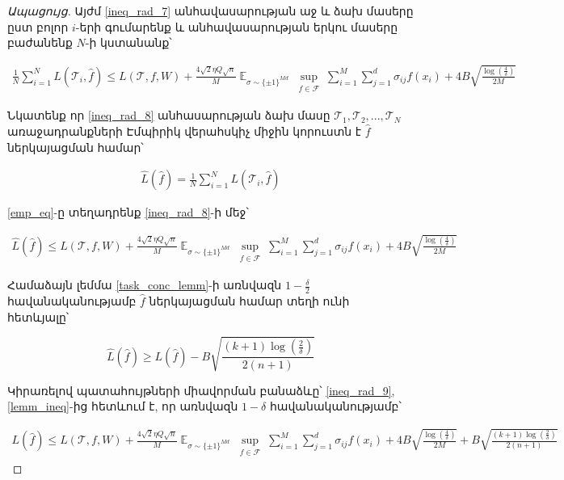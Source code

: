 \documentclass[11pt]{article}
\DeclareMathOperator*{\E}{\mathbb{E}}
\begin{document}
\begin{proof}[Ապացույց]
Այժմ \ref{ineq_rad_7} անհավասարության աջ և ձախ մասերը ըստ բոլոր $i $-երի գումարենք և անհավասարության երկու մասերը բաժանենք $N$-ի կստանանք՝

\begin{align}
\label{ineq_rad_8}
\frac{1}{N}\sum_{i=1}^NL(\mathcal{T}_i, \hat{f}) \leq  L(\mathcal{T}, f, W) + \frac{4\sqrt{2} \eta Q\sqrt{n}}{M} \E_{\sigma \sim \{\pm1\}^{Md}} \sup_{\substack{ f  \in \mathcal{F}  }}\sum_{i=1}^M \sum_{j=1}^d \sigma_{ij}f(x_i)+    4B\sqrt{\frac{\log \left( \frac{4}{\delta} \right)}{2M}}
\end{align}

Նկատենք որ \ref{ineq_rad_8} անհասարության ձախ մասը $\mathcal{T}_1,\mathcal{T}_2, ...,\mathcal{T}_N$ առաջադրանքների Էմպիրիկ վերահսկիչ միջին կորուստն է $\hat{f}$ ներկայացման համար՝


\begin{align}
\label{emp_eq}
\hat{L}(\hat{f}) = \frac{1}{N}\sum_{i=1}^NL(\mathcal{T}_i, \hat{f})
\end{align}

\ref{emp_eq}-ը տեղադրենք \ref{ineq_rad_8}-ի մեջ՝
 
\begin{align}
\label{ineq_rad_9}
\hat{L}(\hat{f}) \leq  L(\mathcal{T}, f, W) + \frac{4\sqrt{2} \eta Q\sqrt{n}}{M} \E_{\sigma \sim \{\pm1\}^{Md}} \sup_{\substack{ f  \in \mathcal{F}  }}\sum_{i=1}^M \sum_{j=1}^d \sigma_{ij}f(x_i)+    4B\sqrt{\frac{\log \left( \frac{4}{\delta} \right)}{2M}}
\end{align}

Համաձայն լեմմա \ref{task_conc_lemm}-ի առնվազն $1-\frac{\delta}{2}$ հավանականությամբ $\hat{f}$ ներկայացման համար տեղի ունի հետևյալը՝ 


\begin{equation}
\label{lemm_ineq}
\hat{L}(\hat{f}) \geq L(\hat{f}) - B\sqrt{\frac{\left(k+1\right)\log \left(\frac{2}{\delta}\right) }{2(n+1)}}
\end{equation}



Կիրառելով պատահույթների միավորման բանաձևը՝ \ref{ineq_rad_9}, \ref{lemm_ineq}-ից  հետևում է, որ առնվազն $1-\delta$ հավանականությամբ՝

 
\begin{align*}
\label{ineq_rad_10}
L(\hat{f}) \leq  L(\mathcal{T}, f, W) + \frac{4\sqrt{2} \eta Q\sqrt{n}}{M} \E_{\sigma \sim \{\pm1\}^{Md}} \sup_{\substack{ f  \in \mathcal{F}  }}\sum_{i=1}^M \sum_{j=1}^d \sigma_{ij}f(x_i)+    4B\sqrt{\frac{\log \left( \frac{4}{\delta} \right)}{2M}} + B\sqrt{\frac{\left(k+1\right)\log \left(\frac{2}{\delta}\right) }{2(n+1)}}
\end{align*}

 \end{proof}
\end{document}
